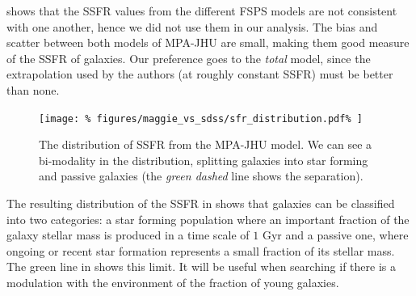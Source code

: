  shows that the SSFR values from the different
FSPS models are not consistent with one another, hence we did not use them in
our analysis. The bias and scatter between both models of MPA-JHU are small,
making them good measure of the SSFR of galaxies. Our preference goes to the
\emph{total} model, since the extrapolation used by the authors (at roughly
constant SSFR) must be better than none.

\begin{figure}[htb]
    \centering
    \texttt{[image: \%
        figures/maggie\_vs\_sdss/sfr\_distribution.pdf\%
    ]}
    \caption{The distribution of SSFR from the MPA-JHU model. We can see a
    bi-modality in the distribution, splitting galaxies into star forming
and passive galaxies (the \emph{green dashed} line shows the
separation).\label{fig:ssfr_distribution}}
\end{figure}

The resulting distribution of the SSFR in 
shows that galaxies can be classified into two categories: a star forming
population where an important fraction of the galaxy stellar mass is produced
in a time scale of $1$ Gyr and a passive one, where ongoing or recent star
formation represents a small fraction of its stellar mass. The green line in
 shows this limit. It will be useful when
searching if there is a modulation with the environment of the fraction of
young galaxies.


